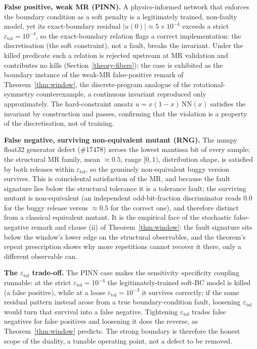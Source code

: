 \documentclass[review,12pt,authoryear]{elsarticle}
\begin{document}
\textbf{False positive, weak MR (PINN).} A physics-informed network
that enforces the boundary condition as a soft penalty is a legitimately
trained, non-faulty model, yet its exact-boundary residual
$|u(0)| \approx 5\times10^{-4}$ exceeds a strict
$\varepsilon_{\mathrm{tol}} = 10^{-4}$, so the exact-boundary relation
flags a correct implementation: the discretisation (the soft
constraint), not a fault, breaks the invariant. Under the killed
predicate such a relation is rejected upstream at MR validation and
contributes no kills (Section~\ref{theory-fibers}); the case is
exhibited as the boundary instance of the weak-MR false-positive remark
of Theorem~\ref{thm:window}, the discrete-program analogue of the
rotational-symmetry counterexample, a continuous invariant reproduced
only approximately. The
hard-constraint ansatz $u = x(1-x)\,\mathrm{NN}(x)$ satisfies the invariant
by construction and passes, confirming that the violation is a property of
the discretisation, not of training.

\textbf{False negative, surviving non-equivalent mutant (RNG).} The
numpy float32 generator defect (\#17478) zeroes the lowest mantissa bit of
every sample; the structural MR family, mean $\approx 0.5$, range
$[0,1)$, distribution shape, is satisfied by both releases within
$\varepsilon_{\mathrm{tol}}$, so the genuinely non-equivalent buggy version
survives. This is coincidental satisfaction of the MR, and because the
fault signature lies below the structural tolerance it is a tolerance
fault; the surviving mutant is non-equivalent (an independent
odd-bit-fraction discriminator reads $0.0$ for the buggy release versus
$\approx 0.5$ for the correct one), and therefore distinct from a
classical equivalent mutant. It is the empirical face of the
stochastic false-negative remark and clause (ii) of
Theorem~\ref{thm:window}: the fault signature sits below the window's
lower edge on the structural observables, and the theorem's repeat
prescription shows why more repetitions cannot recover it there, only a
different observable can.

\textbf{The $\varepsilon_{\mathrm{tol}}$ trade-off.} The PINN case makes
the sensitivity--specificity coupling runnable: at the strict
$\varepsilon_{\mathrm{tol}} = 10^{-4}$ the legitimately-trained soft-BC
model is killed (a false positive), while at a loose
$\varepsilon_{\mathrm{tol}} = 10^{-3}$ it survives correctly; if the same
residual pattern instead arose from a true boundary-condition fault,
loosening $\varepsilon_{\mathrm{tol}}$ would turn that survival into a
false negative. Tightening
$\varepsilon_{\mathrm{tol}}$ trades false negatives for false positives and
loosening it does the reverse, as Theorem~\ref{thm:window} predicts. The strong
boundary is therefore the honest scope of the duality, a tunable
operating point, not a defect to be removed.
\end{document}
